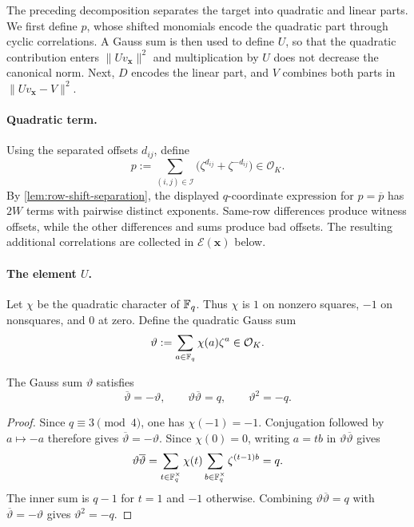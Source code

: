 The preceding decomposition separates the target into quadratic
and linear parts.  We first define $p$, whose shifted monomials encode the
quadratic part through cyclic correlations.  A Gauss sum is then used to
define $U$, so that the quadratic contribution enters
$\|Uv_{\mathbf x}\|^2$ and multiplication by $U$ does not decrease the
canonical norm.  Next, $D$ encodes the linear part, and $V$ combines both
parts in $\|Uv_{\mathbf x}-V\|^2$.
\paragraph{Quadratic term.}
Using the separated offsets $d_{ij}$, define
\begin{equation*}
 p:=\sum_{(i,j)\in\mathcal I}
       \bigl(\zeta^{d_{ij}}+\zeta^{-d_{ij}}\bigr)\in \mathcal{O}_K.
\end{equation*}
By \cref{lem:row-shift-separation}, the displayed $q$-coordinate
expression for $p=\overline p$ has $2W$ terms with pairwise distinct
exponents.  Same-row differences produce
witness offsets, while the other differences and sums produce bad offsets.
The resulting additional correlations are collected in
$\mathcal E(\mathbf x)$ below.

\paragraph{The element $U$.}
Let $\chi$ be the quadratic character of
$\mathbb F_q$.  Thus $\chi$ is $1$ on nonzero squares, $-1$ on nonsquares, and $0$ at
zero.  Define the quadratic Gauss sum
\begin{equation*}
 \vartheta:=\sum_{a\in\mathbb F_q}\chi(a)\zeta^a\in \mathcal{O}_K.
\end{equation*}

\begin{lemma}
\label{lem:gauss-sum}
The Gauss sum $\vartheta$ satisfies
\[
 \overline\vartheta=-\vartheta,
 \qquad
 \vartheta\overline\vartheta=q,
 \qquad
 \vartheta^2=-q.
\]
\end{lemma}

\begin{proof}
Since $q\equiv3\pmod4$, one has $\chi(-1)=-1$.  Conjugation followed by
$a\mapsto-a$ therefore gives $\overline\vartheta=-\vartheta$.
Since $\chi(0)=0$, writing $a=tb$ in
$\vartheta\overline\vartheta$ gives
\[
 \vartheta\overline\vartheta
 =\sum_{t\in\mathbb F_q^\times}\chi(t)
   \sum_{b\in\mathbb F_q^\times}\zeta^{(t-1)b}
 =q.
\]
The inner sum is $q-1$ for $t=1$ and $-1$ otherwise.  Combining
$\vartheta\overline\vartheta=q$ with $\overline\vartheta=-\vartheta$ gives
$\vartheta^2=-q$.
\end{proof}

